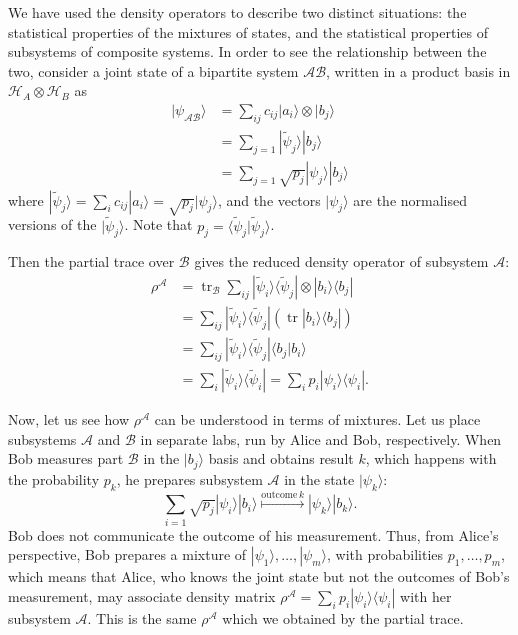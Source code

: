 \documentclass[fleqn]{article}
\begin{document}
We have used the density operators to describe two distinct situations: the statistical properties of the mixtures of states, and the statistical properties of subsystems of composite systems.
In order to see the relationship between the two, consider a joint state of a bipartite system \(\mathcal{AB}\), written in a product basis in \(\mathcal{H}_A\otimes\mathcal{H}_B\) as
\[
  \begin{aligned}
    |\psi_{\mathcal{AB}}\rangle
    &= \sum_{ij} c_{ij}|a_i\rangle\otimes|b_j\rangle
  \\&= \sum_{j=1} |\widetilde\psi_j\rangle|b_j\rangle
  \\&= \sum_{j=1} \sqrt{p_j}|\psi_j\rangle|b_j\rangle
  \end{aligned}
\tag{9.7.1}
\]
where \(|\widetilde\psi_j\rangle = \sum_i c_{ij}|a_i\rangle = \sqrt{p_j}|\psi_j\rangle\), and the vectors \(|\psi_j\rangle\) are the normalised versions of the \(|\widetilde\psi_j\rangle\).
Note that \(p_j=\langle\widetilde\psi_j|\widetilde\psi_j\rangle\).

Then the partial trace over \(\mathcal{B}\) gives the reduced density operator of subsystem \(\mathcal{A}\):
\[
  \begin{aligned}
    \rho^{\mathcal{A}}
    &=\operatorname{tr}_{\mathcal{B}} \sum_{ij} |\widetilde\psi_i\rangle\langle\widetilde\psi_j| \otimes |b_i\rangle\langle b_j|
  \\&= \sum_{ij} |\widetilde\psi_i\rangle\langle\widetilde\psi_j| (\operatorname{tr}|b_i\rangle\langle b_j|)
  \\&= \sum_{ij} |\widetilde\psi_i\rangle\langle\widetilde\psi_j| \langle b_j|b_i\rangle
  \\&= \sum_{i} |\widetilde\psi_i\rangle\langle\widetilde\psi_i|
    = \sum_{i} p_i |\psi_i\rangle\langle\psi_i|.
  \end{aligned}
\]

Now, let us see how \(\rho^{\mathcal{A}}\) can be understood in terms of mixtures.
Let us place subsystems \(\mathcal{A}\) and \(\mathcal{B}\) in separate labs, run by Alice and Bob, respectively.
When Bob measures part \(\mathcal{B}\) in the \(|b_j\rangle\) basis and obtains result \(k\), which happens with the probability \(p_k\), he prepares subsystem \(\mathcal{A}\) in the state \(|\psi_k\rangle\):
\[
  \sum_{i=1} \sqrt{p_j}|\psi_i\rangle|b_i\rangle
  \overset{\mathrm{outcome}\,k}{\longmapsto}
  |\psi_k\rangle|b_k\rangle.
\]
Bob does not communicate the outcome of his measurement.
Thus, from Alice's perspective, Bob prepares a mixture of \(|\psi_1\rangle,\ldots,|\psi_m\rangle\), with probabilities \(p_1,\ldots,p_m\), which means that Alice, who knows the joint state but not the outcomes of Bob's measurement, may associate density matrix \(\rho^\mathcal{A}=\sum_i p_i|\psi_i\rangle\langle\psi_i|\) with her subsystem \(\mathcal{A}\).
This is the same \(\rho^{\mathcal{A}}\) which we obtained by the partial trace.
\end{document}
